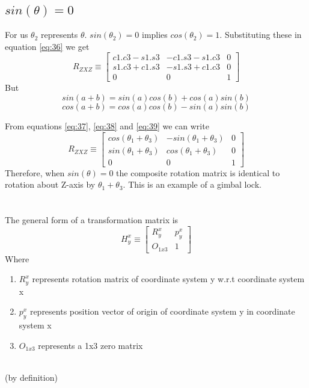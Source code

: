 \documentclass[12pt]{article}
\newcommand{\bydefn}{{\\ \color{blue} \hspace*{\fill}(by definition)} \\}
\newcommand{\rz}[1]{\begin{bmatrix} cos(#1) & -sin(#1) & 0 \\ sin(#1) & cos(#1) & 0 \\ 0 & 0 & 1 \end{bmatrix}}
\begin{document}
\subsection{$sin(\theta) = 0$}
For us $\theta_2$ represents $\theta$.
$sin(\theta_2) = 0$ implies $cos(\theta_2) = 1$. Substituting these in equation \ref{eq:36} we get
\begin{equation}
  \label{eq:37}
  R_{ZXZ} \equiv \begin{bmatrix} c1.c3 - s1.s3 & -c1.s3 - s1.c3 & 0 \\ s1.c3 + c1.s3 & -s1.s3 + c1.c3 & 0 \\ 0 & 0 & 1 \end{bmatrix}
\end{equation}
But
\begin{equation}
  \label{eq:38}
  sin(a + b) = sin(a)cos(b) + cos(a)sin(b)
\end{equation}
\begin{equation}
  \label{eq:39}
  cos(a + b) = cos(a)cos(b) - sin(a)sin(b)
\end{equation}

From equations \ref{eq:37}, \ref{eq:38} and \ref{eq:39} we can write
\begin{equation}
  \label{eq:310}
  R_{ZXZ} \equiv \rz{\theta_1 + \theta_3}
\end{equation}
Therefore, when $sin(\theta) = 0$ the composite rotation matrix is identical to rotation about Z-axis by $ \theta_1 + \theta_3 $.
This is an example of a gimbal lock.

\pagebreak

\section{}
\subsection{}
The general form of a transformation matrix is
\[
  H_{y}^{x} \equiv \begin{bmatrix} R_{y}^{x} & p_{y}^{x} \\ O_{1x3} & 1 \end{bmatrix}
\]
Where
\begin{enumerate}[nolistsep]
  \item $ R_{y}^{x} $ represents rotation matrix of coordinate system y w.r.t coordinate system x
  \item $ p_{y}^{x} $ represents position vector of origin of coordinate system y in coordinate system x
  \item $ O_{1x3} $ represents a 1x3 zero matrix
\end{enumerate}
\bydefn
\end{document}
